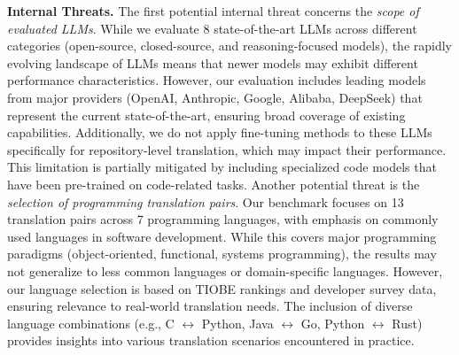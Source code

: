 \noindent \textbf{Internal Threats.}
The first potential internal threat concerns the \textit{scope of evaluated LLMs}. While we evaluate 8 state-of-the-art LLMs across different categories (open-source, closed-source, and reasoning-focused models), the rapidly evolving landscape of LLMs means that newer models may exhibit different performance characteristics. However, our evaluation includes leading models from major providers (OpenAI, Anthropic, Google, Alibaba, DeepSeek) that represent the current state-of-the-art, ensuring broad coverage of existing capabilities. Additionally, we do not apply fine-tuning methods to these LLMs specifically for repository-level translation, which may impact their performance. This limitation is partially mitigated by including specialized code models that have been pre-trained on code-related tasks.
Another potential threat is the \textit{selection of programming translation pairs}. Our benchmark focuses on 13 translation pairs across 7 programming languages, with emphasis on commonly used languages in software development. While this covers major programming paradigms (object-oriented, functional, systems programming), the results may not generalize to less common languages or domain-specific languages. However, our language selection is based on TIOBE rankings and developer survey data, ensuring relevance to real-world translation needs. The inclusion of diverse language combinations (e.g., C $\leftrightarrow$ Python, Java $\leftrightarrow$ Go, Python $\leftrightarrow$ Rust) provides insights into various translation scenarios encountered in practice.


